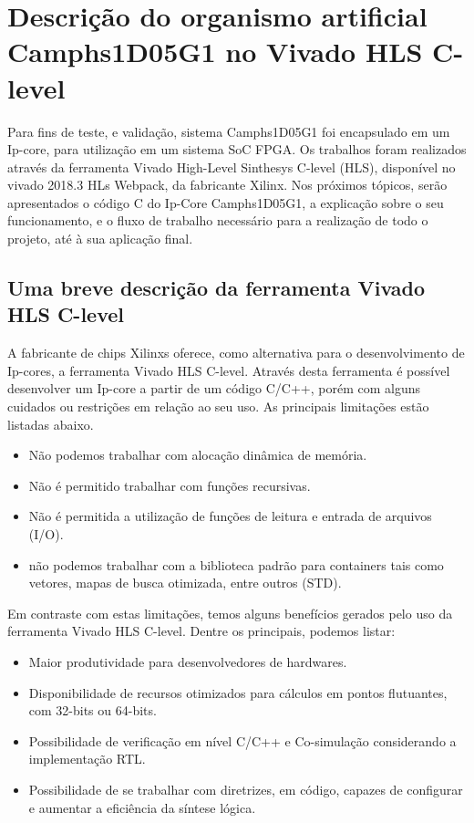 \chapter[Descrição do organismo artificial Camphs1D05G1 no Vivado HLS C-level]{Descrição do organismo artificial Camphs1D05G1 no Vivado HLS C-level}



Para fins de teste, e validação, sistema Camphs1D05G1 foi encapsulado em um Ip-core, para utilização em um sistema SoC FPGA. Os trabalhos foram realizados através da ferramenta Vivado High-Level Sinthesys C-level (HLS), disponível no vivado 2018.3 HLs Webpack, da fabricante Xilinx. Nos próximos tópicos, serão apresentados o código C do Ip-Core Camphs1D05G1, a explicação sobre o seu funcionamento, e o fluxo de trabalho necessário para a realização de todo o projeto, até à sua aplicação final. 

\section{Uma breve descrição da ferramenta Vivado HLS C-level}

A fabricante de chips Xilinxs oferece, como alternativa para o desenvolvimento de Ip-cores, a ferramenta Vivado HLS C-level. Através desta ferramenta é possível desenvolver um Ip-core a partir de um código C/C++, porém com alguns cuidados ou restrições em relação ao seu uso. As principais limitações estão listadas abaixo.

\begin{itemize}
  \item Não podemos trabalhar com alocação dinâmica de memória.
  \item Não é permitido trabalhar com funções recursivas.
  \item Não é permitida a utilização de funções de leitura e entrada de arquivos (I/O).
  \item não podemos trabalhar com a biblioteca padrão para containers tais como vetores, mapas de busca otimizada, entre outros (STD).
\end{itemize}

Em contraste com estas limitações, temos alguns benefícios gerados pelo uso da ferramenta Vivado HLS C-level. Dentre os principais, podemos listar:

\begin{itemize}
  \item Maior produtividade para desenvolvedores de hardwares.
  \item Disponibilidade de recursos otimizados para cálculos em pontos flutuantes, com 32-bits ou 64-bits.
  \item Possibilidade de verificação em nível C/C++ e Co-simulação considerando a implementação RTL.
  \item Possibilidade de se trabalhar com diretrizes, em código, capazes de configurar e aumentar a eficiência da síntese lógica.
\end{itemize}

